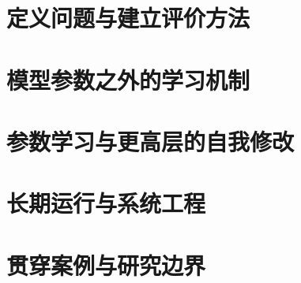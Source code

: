 


\raggedbottom

\frontmatter




\setcounter{tocdepth}{1}
\tableofcontents

\mainmatter

\part{定义问题与建立评价方法}




\part{模型参数之外的学习机制}







\part{参数学习与更高层的自我修改}




\part{长期运行与系统工程}



\part{贯穿案例与研究边界}



\appendix








\backmatter
\printbibliography[heading=bibintoc,title={参考文献}]


